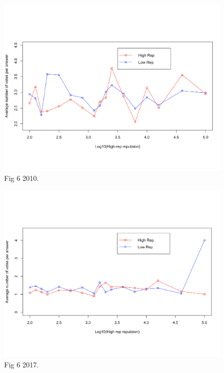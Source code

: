 \begin{figure}[!t]
	\centering
	\includegraphics[width=0.8\columnwidth]{img/Fig6_2010.pdf}
	\caption{Fig 6 2010.}
	\label{fig:fig6_2010}
\end{figure}

\begin{figure}[!t]
	\centering
	\includegraphics[width=0.8\columnwidth]{img/Fig6_2017.pdf}
	\caption{Fig 6 2017.}
	\label{fig:fig6_2017}
\end{figure}

